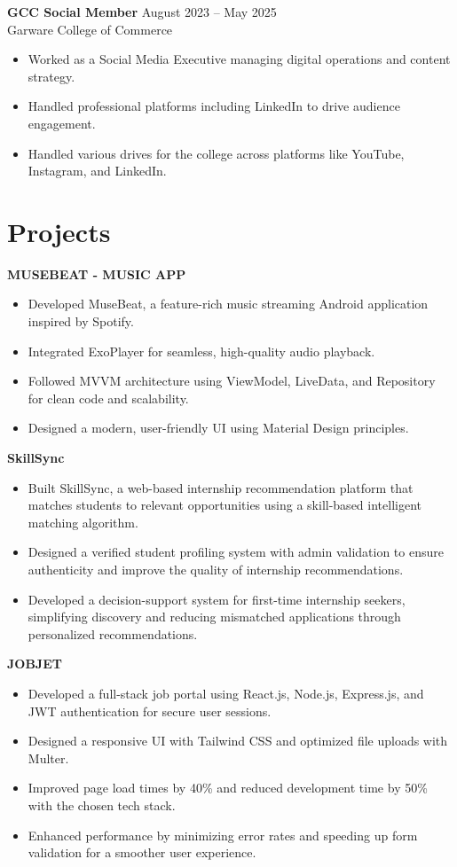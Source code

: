 \documentclass[a4paper,10pt]{article}
\begin{document}
\vspace{6pt}

\textbf{GCC Social Member} \hfill August 2023 -- May 2025\\
Garware College of Commerce

\begin{itemize}[leftmargin=*]
    \item Worked as a Social Media Executive managing digital operations and content strategy.
    \item Handled professional platforms including LinkedIn to drive audience engagement.
    \item Handled various drives for the college across platforms like YouTube, Instagram, and LinkedIn.
\end{itemize}

\section*{Projects}

\textbf{MUSEBEAT - MUSIC APP}
\begin{itemize}[leftmargin=*]
    \item Developed MuseBeat, a feature-rich music streaming Android application inspired by Spotify.
    \item Integrated ExoPlayer for seamless, high-quality audio playback.
    \item Followed MVVM architecture using ViewModel, LiveData, and Repository for clean code and scalability.
    \item Designed a modern, user-friendly UI using Material Design principles.
\end{itemize}

\textbf{SkillSync}
\begin{itemize}[leftmargin=*]
    \item Built SkillSync, a web-based internship recommendation platform that matches students to relevant opportunities using a skill-based intelligent matching algorithm.
    \item Designed a verified student profiling system with admin validation to ensure authenticity and improve the quality of internship recommendations.
    \item Developed a decision-support system for first-time internship seekers, simplifying discovery and reducing mismatched applications through personalized recommendations.
\end{itemize}

\textbf{JOBJET}
\begin{itemize}[leftmargin=*]
    \item Developed a full-stack job portal using React.js, Node.js, Express.js, and JWT authentication for secure user sessions.
    \item Designed a responsive UI with Tailwind CSS and optimized file uploads with Multer.
    \item Improved page load times by 40\% and reduced development time by 50\% with the chosen tech stack.
    \item Enhanced performance by minimizing error rates and speeding up form validation for a smoother user experience.
\end{itemize}
\end{document}
